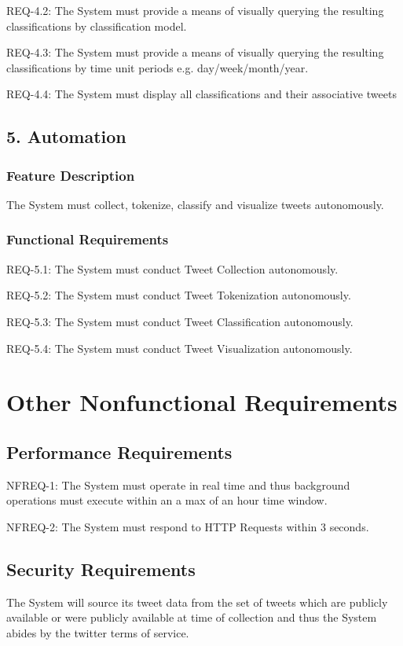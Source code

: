 \documentclass[11pt]{report}
\begin{document}
REQ-4.2: The System must provide a means of visually querying the resulting classifications by classification model.

REQ-4.3: The System must provide a means of visually querying the resulting classifications by time unit periods e.g. day/week/month/year.

REQ-4.4: The System must display all classifications and their associative tweets

\subsection*{5. Automation}
\subsubsection*{Feature Description}
The System must collect, tokenize, classify and visualize tweets autonomously.

\subsubsection*{Functional Requirements}
REQ-5.1: The System must conduct Tweet Collection autonomously.

REQ-5.2: The System must conduct Tweet Tokenization autonomously.

REQ-5.3: The System must conduct Tweet Classification autonomously.

REQ-5.4: The System must conduct Tweet Visualization autonomously.


\clearpage

\section*{Other Nonfunctional Requirements}
\subsection*{Performance Requirements}
NFREQ-1: The System must operate in real time and thus background operations must execute within an a max of an hour time window. 

NFREQ-2: The System must respond to HTTP Requests within 3 seconds.

\subsection*{Security Requirements}
The System will source its tweet data from the set of tweets which are publicly available or were publicly available at time of collection and thus the System abides by the twitter terms of service.
\end{document}
